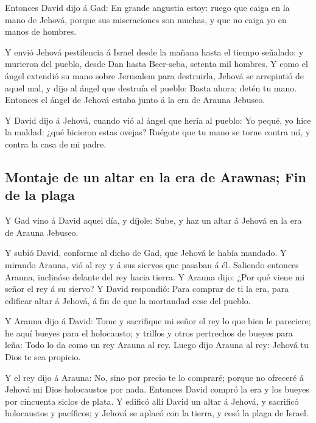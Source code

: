  Entonces David dijo á Gad: En grande angustia estoy:
ruego que caiga en la mano de Jehová, porque sus miseraciones son
muchas, y que no caiga yo en manos de hombres.

 Y envió Jehová pestilencia á Israel desde la mañana
hasta el tiempo señalado: y murieron del pueblo, desde Dan hasta
Beer-seba, setenta mil hombres.  Y como el ángel extendió
su mano sobre Jerusalem para destruirla, Jehová se arrepintió de aquel
mal, y dijo al ángel que destruía el pueblo: Basta ahora; detén tu mano.
Entonces el ángel de Jehová estaba junto á la era de Arauna Jebuseo.

 Y David dijo á Jehová, cuando vió al ángel que hería al
pueblo: Yo pequé, yo hice la maldad: ¿qué hicieron estas ovejas? Ruégote
que tu mano se torne contra mí, y contra la casa de mi padre.

\hypertarget{montaje-de-un-altar-en-la-era-de-arawnas-fin-de-la-plaga}{%
\subsection{Montaje de un altar en la era de Arawnas; Fin de la
plaga}\label{montaje-de-un-altar-en-la-era-de-arawnas-fin-de-la-plaga}}

 Y Gad vino á David aquel día, y díjole: Sube, y haz un
altar á Jehová en la era de Arauna Jebuseo.

 Y subió David, conforme al dicho de Gad, que Jehová le
había mandado.  Y mirando Arauna, vió al rey y á sus
siervos que pasaban á él. Saliendo entonces Arauna, inclinóse delante
del rey hacia tierra.  Y Arauna dijo: ¿Por qué viene mi
señor el rey á su siervo? Y David respondió: Para comprar de ti la era,
para edificar altar á Jehová, á fin de que la mortandad cese del pueblo.

 Y Arauna dijo á David: Tome y sacrifique mi señor el rey
lo que bien le pareciere; he aquí bueyes para el holocausto; y trillos y
otros pertrechos de bueyes para leña:  Todo lo da como un
rey Arauna al rey. Luego dijo Arauna al rey: Jehová tu Dios te sea
propicio.

 Y el rey dijo á Arauna: No, sino por precio te lo
compraré; porque no ofreceré á Jehová mi Dios holocaustos por nada.
Entonces David compró la era y los bueyes por cincuenta siclos de plata.
 Y edificó allí David un altar á Jehová, y sacrificó
holocaustos y pacíficos; y Jehová se aplacó con la tierra, y cesó la
plaga de Israel.
